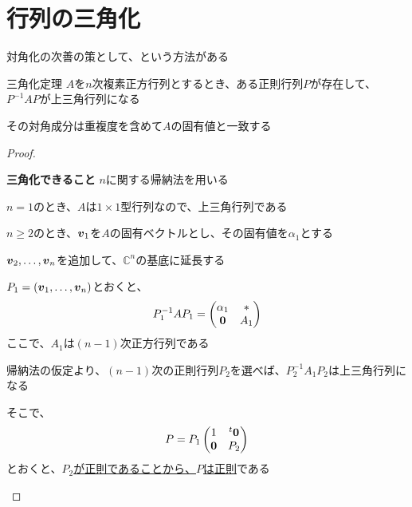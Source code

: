\documentclass[../../../topic_linear-algebra]{subfiles}
\begin{document}
\sectionline
\section{行列の三角化}

対角化の次善の策として、という方法がある

\begin{theorem}{三角化定理}
  $A$を$n$次複素正方行列とするとき、ある正則行列$P$が存在して、$P^{-1}AP$が上三角行列になる

  その対角成分は重複度を含めて$A$の固有値と一致する
\end{theorem}

\begin{proof}
  \begin{subpattern}{\bfseries 三角化できること}
    $n$に関する帰納法を用いる

    \br

    $n=1$のとき、$A$は$1\times 1$型行列なので、上三角行列である

    \br

    $n \geq 2$のとき、$\vb*{v}_1$を$A$の固有ベクトルとし、その固有値を$\alpha_1$とする

    $\vb*{v}_2,\ldots,\vb*{v}_n$を追加して、$\mathbb{C}^n$の基底に延長する

    $P_1 = (\vb*{v}_1,\ldots,\vb*{v}_n)$とおくと、
    \begin{equation*}
      P_1^{-1}AP_1 = \begin{pmatrix}
        \alpha_1 & *   \\
        \vb*{0}  & A_1
      \end{pmatrix}
    \end{equation*}
    ここで、$A_1$は$(n-1)$次正方行列である

    \br

    帰納法の仮定より、$(n-1)$次の正則行列$P_2$を選べば、$P_2^{-1}A_1P_2$は上三角行列になる

    \br

    そこで、
    \begin{equation*}
      P = P_1 \begin{pmatrix}
        1       & {}^t\vb*{0} \\
        \vb*{0} & P_2
      \end{pmatrix}
    \end{equation*}
    とおくと、\hyperref[thm:block-diagonal-invertibility]{$P_2$が正則であることから、$P$は正則}である


\end{subpattern}
\end{proof}
\end{document}
